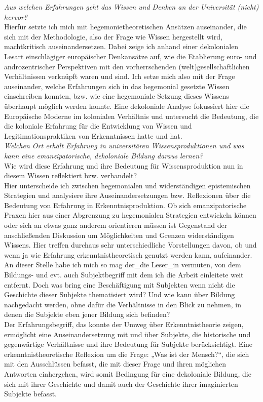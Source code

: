 \noindent\textit{Aus welchen Erfahrungen geht das Wissen und Denken an der Universität
(nicht) hervor?}\\ 
Hierfür setzte ich mich mit hegemonietheoretischen Ansätzen
auseinander, die sich mit der Methodologie, also der Frage wie Wissen
hergestellt wird, machtkritisch auseinandersetzen. Dabei zeige ich anhand einer
dekolonialen Lesart einschlägiger europäischer Denkansätze auf, wie die
Etablierung euro- und androzentrischer Perspektiven mit den vorherrschenden
(welt)gesellschaftlichen Verhältnissen verknüpft waren und sind. Ich setze mich
also mit der Frage auseinander, welche Erfahrungen sich in das hegemonial
gesetzte Wissen einschreiben konnten, bzw. wie eine hegemoniale Setzung dieses
Wissens überhaupt möglich werden konnte. Eine dekoloniale Analyse fokussiert
hier die Europäische Moderne im kolonialen Verhältnis und untersucht die
Bedeutung, die die koloniale Erfahrung für die Entwicklung von Wissen und
Legitimationspraktiken von Erkenntnissen hatte und hat.\\[0.75em]
\textit{Welchen Ort erhält Erfahrung in universitären Wissensproduktionen und
was kann eine emanzipatorische, dekoloniale Bildung daraus lernen? }\\
Wie wird diese Erfahrung und ihre Bedeutung für Wissensproduktion nun in diesem
Wissen reflektiert bzw. verhandelt?\\ Hier unterscheide ich zwischen
hegemonialen und widerständigen epistemischen Strategien und analysiere ihre
Auseinandersetzungen bzw. Reflexionen über die Bedeutung von Erfahrung in
Erkenntnisproduktion. Ob sich emanzipatorische Praxen hier aus einer Abgrenzung
zu hegemonialen Strategien entwickeln können oder sich an etwas ganz anderem
orientieren müssen ist Gegenstand der anschließenden Diskussion um
Möglichkeiten und Grenzen widerständigen Wissens. Hier treffen durchaus sehr
unterschiedliche Vorstellungen davon, ob und wenn ja wie Erfahrung
erkenntnistheoretisch genutzt werden kann, aufeinander.\\

\noindent An dieser Stelle habe ich mich so mag der\_die Leser\_in vermuten, von dem
Bildungs- und evt. auch Subjektbegriff mit dem ich die Arbeit einleitete weit
entfernt. Doch was bring eine Beschäftigung mit Subjekten wenn nicht die
Geschichte dieser Subjekte thematisiert wird? Und wie kann über Bildung
nachgedacht werden, ohne dafür die Verhältnisse in den Blick zu nehmen, in
denen die Subjekte eben jener Bildung sich befinden?\\
Der Erfahrungsbegriff, das konnte der Umweg über Erkenntnistheorie zeigen,
ermöglicht eine Auseinandersetzung mit und über Subjekte, die historische und
gegenwärtige Verhältnisse und ihre Bedeutung für Subjekte berücksichtigt. Eine
erkenntnistheoretische Reflexion um die Frage: „Was ist der Mensch?“, die sich
mit den Ausschlüssen befasst, die mit dieser Frage und ihren möglichen
Antworten einhergehen, wird somit Bedingung für eine dekoloniale Bildung, die
sich mit ihrer Geschichte und damit auch der Geschichte ihrer imaginierten
Subjekte befasst.\\

